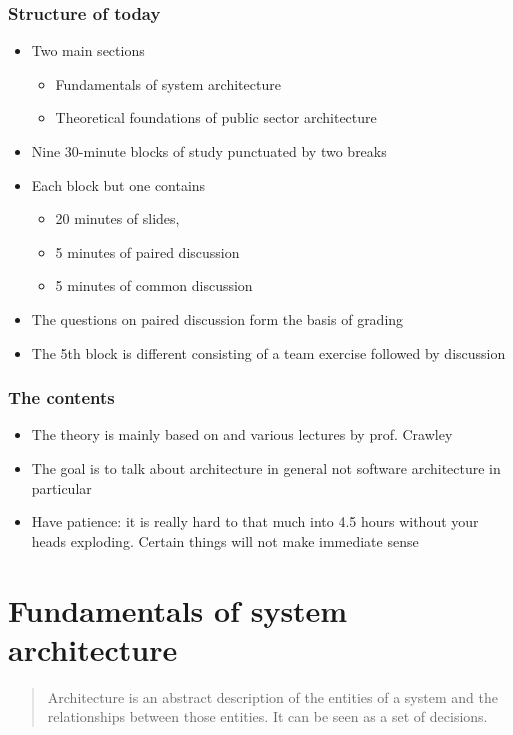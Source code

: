 \documentclass[10pt, compress]{beamer}
\begin{document}
\begin{frame}[fragile]
  \frametitle{Structure of today}
	\begin{itemize}
		\item Two main sections
			\begin{itemize}
				\item Fundamentals of system architecture
				\item Theoretical foundations of public sector architecture
			\end{itemize}
		\item Nine 30-minute blocks of study punctuated by two breaks
		\item Each block but one contains 
			\begin{itemize}
				\item 20 minutes of slides, 
				\item 5 minutes of paired discussion
				\item 5 minutes of common discussion
			\end{itemize}
		\item The questions on paired discussion form the basis of grading
		\item The 5th block is different consisting of a team exercise followed by discussion
	\end{itemize}
\end{frame}

\begin{frame}[fragile]
  \frametitle{The contents}
	\begin{itemize}
		\item The theory is mainly based on \cite{crawley2015systems} and various lectures by prof. Crawley
		\item The goal is to talk about architecture in general not software architecture in particular
		\item Have patience: it is really hard to that much into 4.5 hours without your heads exploding. Certain things will not make immediate sense
	\end{itemize}
\end{frame}

\section{Fundamentals of system architecture}
\begin{frame}[fragile]
  \begin{quote}
    Architecture is an abstract description of the entities of a system and the relationships between those entities. It can be seen as a set of decisions. 
  \end{quote}
	\cite{crawley2015systems}
\end{frame}
\end{document}
